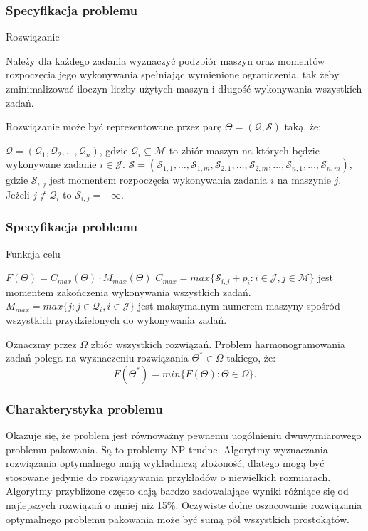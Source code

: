 \documentclass{beamer}
\begin{document}
\begin{frame}
    \frametitle{Specyfikacja problemu}
    Rozwiązanie
    \begin{outline}
        \1 Należy dla każdego zadania wyznaczyć podzbiór maszyn oraz momentów rozpoczęcia jego wykonywania spełniając wymienione ograniczenia, tak żeby zminimalizować iloczyn liczby
        użytych maszyn i długość wykonywania wszystkich zadań.
    \end{outline}
    
    
    Rozwiązanie może być reprezentowane przez parę $\Theta=(\mathcal{Q},\mathcal{S})$ taką, że:
    \begin{outline}
        \1 $\mathcal{Q}=(\mathcal{Q}_1,\mathcal{Q}_2,\dots,\mathcal{Q}_n)$, gdzie 
        $\mathcal{Q}_i \subseteq \mathcal{M}$
        to zbiór maszyn na których będzie wykonywane zadanie $i\in\mathcal{J}$.
        \1 $\mathcal{S}=(\mathcal{S}_{1,1},\dots,\mathcal{S}_{1,m},\mathcal{S}_{2,1},
        \dots,\mathcal{S}_{2,m},\dots,\mathcal{S}_{n,1},\dots,\mathcal{S}_{n,m})$, gdzie
        $\mathcal{S}_{i,j}$ jest momentem rozpoczęcia wykonywania zadania $i$ na maszynie $j$.
        Jeżeli $j\notin\mathcal{Q}_i$ to $\mathcal{S}_{i,j}=-\infty$.
    \end{outline}
    
\end{frame}

\begin{frame}
    \frametitle{Specyfikacja problemu}
    Funkcja celu
    \begin{outline}
        \1 $F(\Theta)=C_{max}(\Theta)\cdot M_{max}(\Theta)$
        \1 $C_{max}=max\{\mathcal{S}_{i,j}+p_i: i\in\mathcal{J}, j\in\mathcal{M}\}$
        jest momentem zakończenia wykonywania wszystkich zadań.
        \1 $M_{max}=max\{j:j\in\mathcal{Q}_i,i\in\mathcal{J}\}$
        jest maksymalnym numerem maszyny spośród wszystkich przydzielonych 
        do wykonywania zadań.
    \end{outline}
    
    Oznaczmy przez $\Omega$ zbiór wszystkich rozwiązań.
    Problem harmonogramowania zadań polega na wyznaczeniu rozwiązania $\Theta^*\in\Omega$
    takiego, że:
    $$F(\Theta^*)=min\{F(\Theta):\Theta\in\Omega\}.$$
\end{frame}

\begin{frame}
    \frametitle{Charakterystyka problemu}
    \begin{outline}
        \1 Okazuje się, że problem jest równoważny pewnemu uogólnieniu dwuwymiarowego
        problemu pakowania.
        \1 Są to problemy NP-trudne. Algorytmy wyznaczania rozwiązania optymalnego mają wykładniczą
        złożoność, dlatego mogą być stosowane jedynie do rozwiązywania przykładów o niewielkich rozmiarach.
        \1 Algorytmy przybliżone często dają bardzo zadowalające wyniki różniące się od najlepszych rozwiązań o mniej niż 15\%.
        \1 Oczywiste dolne oszacowanie rozwiązania optymalnego problemu pakowania może być
        sumą pól wszystkich prostokątów.
    \end{outline}
\end{frame}
\end{document}
